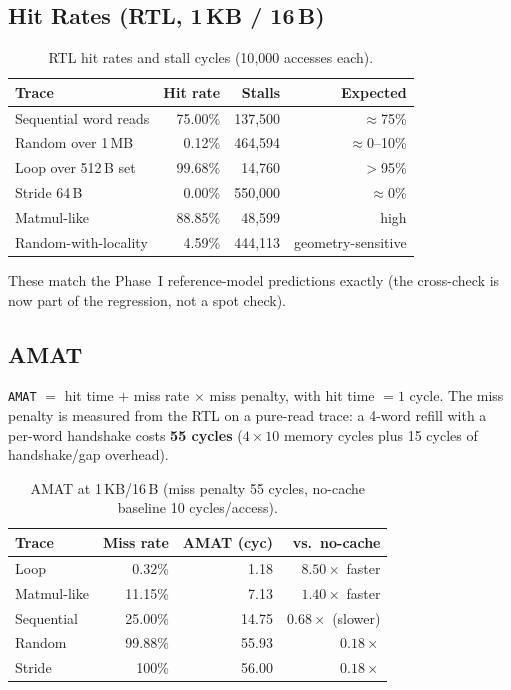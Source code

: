 \documentclass[conference]{IEEEtran}
\begin{document}
\subsection{Hit Rates (RTL, 1\,KB / 16\,B)}
\begin{table}[htbp]
  \centering
  \caption{RTL hit rates and stall cycles (10{,}000 accesses each).}
  \begin{tabular}{lrrr}
    \toprule
    Trace & Hit rate & Stalls & Expected \\
    \midrule
    Sequential word reads & 75.00\% & 137{,}500 & $\approx$75\% \\
    Random over 1\,MB     & 0.12\%  & 464{,}594 & $\approx$0--10\% \\
    Loop over 512\,B set  & 99.68\% & 14{,}760  & $>$95\% \\
    Stride 64\,B          & 0.00\%  & 550{,}000 & $\approx$0\% \\
    Matmul-like           & 88.85\% & 48{,}599  & high \\
    Random-with-locality  & 4.59\%  & 444{,}113 & geometry-sensitive \\
    \bottomrule
  \end{tabular}
\end{table}

These match the Phase~I reference-model predictions exactly (the cross-check
is now part of the regression, not a spot check).

\subsection{AMAT}
\texttt{AMAT} $=$ hit time $+$ miss rate $\times$ miss penalty, with hit time
$= 1$ cycle. The miss penalty is measured from the RTL on a pure-read trace:
a 4-word refill with a per-word handshake costs \textbf{55 cycles}
($4 \times 10$ memory cycles plus 15 cycles of handshake/gap overhead).

\begin{table}[htbp]
  \centering
  \caption{AMAT at 1\,KB/16\,B (miss penalty 55 cycles, no-cache baseline
  10 cycles/access).}
  \begin{tabular}{lrrr}
    \toprule
    Trace & Miss rate & AMAT (cyc) & vs.\ no-cache \\
    \midrule
    Loop          & 0.32\%  & 1.18  & $8.50\times$ faster \\
    Matmul-like   & 11.15\% & 7.13  & $1.40\times$ faster \\
    Sequential    & 25.00\% & 14.75 & $0.68\times$ (slower) \\
    Random        & 99.88\% & 55.93 & $0.18\times$ \\
    Stride        & 100\%   & 56.00 & $0.18\times$ \\
    \bottomrule
  \end{tabular}
\end{table}
\end{document}

